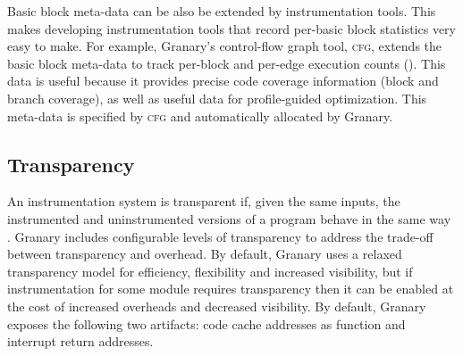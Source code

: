\documentclass[preprint]{sigplanconf}
\newcommand{\toolname}[1]{{\scshape #1}}
\begin{document}
Basic block meta-data can be also be extended by instrumentation tools. This makes developing instrumentation tools that record per-basic block statistics very easy to make. For example, Granary's control-flow graph tool, \toolname{cfg}, extends the basic block meta-data to track per-block and per-edge execution counts (). This data is useful because it provides precise code coverage information (block and branch coverage), as well as useful data for profile-guided optimization. This meta-data is specified by \toolname{cfg} and automatically allocated by Granary. 










\subsection{Transparency}\label{sec:transparency}
An instrumentation system is transparent if, given the same inputs, the instrumented and uninstrumented versions of a program behave in the same way \cite{Transparency}. Granary includes configurable levels of transparency to address the trade-off between transparency and overhead. By default, Granary uses a relaxed transparency \cite{btkernel} model for efficiency, flexibility and increased visibility, but if instrumentation for some module requires transparency then it can be enabled at the cost of increased overheads and decreased visibility. By default, Granary exposes the following two artifacts: code cache addresses as function and interrupt return addresses.
\end{document}
